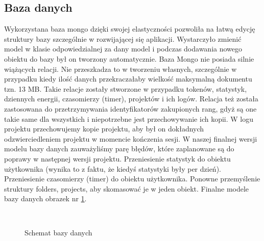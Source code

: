 \documentclass[a4paper,11pt]{report}
\begin{document}
\subsection{Baza danych}
Wykorzystana baza mongo dzięki swojej elastyczności pozwoliła na łatwą edycję struktury bazy szczególnie w rozwijającej się aplikacji.
Wystarczyło zmienić model w klasie odpowiedzialnej za dany model i podczas dodawania nowego obiektu do bazy był on tworzony automatycznie.
Baza Mongo nie posiada silnie wiążących relacji. 
Nie przeszkadza to w tworzeniu własnych, szczególnie w przypadku kiedy ilość danych przekraczałaby wielkość maksymalną dokumentu tzn. 13 MB.
Takie relacje zostały stworzone w przypadku tokenów, statystyk, dziennych energii, czasomierzy (timer), projektów i ich logów. Relacja też została zastosowana do przetrzymywania identyfikatorów zakupionych rang, gdyż są one takie same dla wszystkich i niepotrzebne jest przechowywanie ich kopii.
W logu projektu przechowujemy kopie projektu, aby był on dokładnych odzwierciedleniem projektu w momencie kończenia sesji. W naszej finalnej wersji modelu bazy danych zauważyliśmy parę błędów, które zaplanowane są do poprawy w następnej wersji projektu.
Przeniesienie statystyk do obiektu użytkownika (wynika to z faktu, że kiedyś statystyki były per dzień). Przeniesienie czasomierzy (timer) do obiektu użytkownika. Ponowne przemyślenie struktury folders, projects, aby skomasować je w jeden obiekt.
Finalne modele bazy danych obrazek nr \ref{fig:db}.
\begin{figure}[H]
	\centering
	\\
	\caption{Schemat bazy danych}
	\label{fig:db}
\end{figure}
\end{document}

